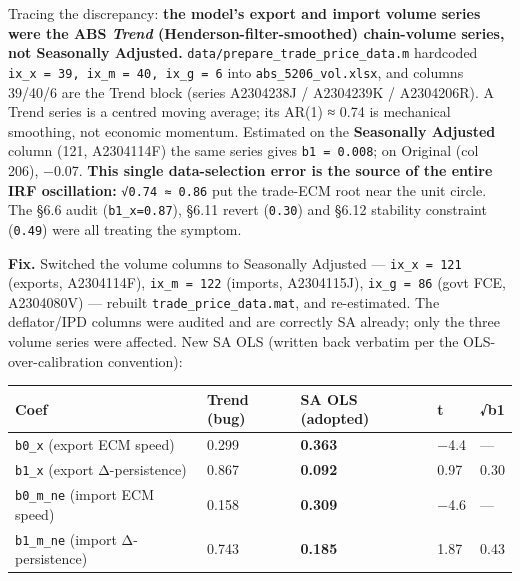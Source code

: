 \documentclass[
]{article}
\newcounter{none} %
\begin{document}
Tracing the discrepancy: \textbf{the model's export and import volume
series were the ABS \emph{Trend} (Henderson-filter-smoothed)
chain-volume series, not Seasonally Adjusted.}
\texttt{data/prepare\_trade\_price\_data.m} hardcoded
\texttt{ix\_x\ =\ 39,\ ix\_m\ =\ 40,\ ix\_g\ =\ 6} into
\texttt{abs\_5206\_vol.xlsx}, and columns 39/40/6 are the Trend block
(series A2304238J / A2304239K / A2304206R). A Trend series is a centred
moving average; its AR(1) ≈ 0.74 is mechanical smoothing, not economic
momentum. Estimated on the \textbf{Seasonally Adjusted} column (121,
A2304114F) the same series gives \texttt{b1\ =\ 0.008}; on Original (col
206), −0.07. \textbf{This single data-selection error is the source of
the entire IRF oscillation:} \texttt{√0.74\ ≈\ 0.86} put the trade-ECM
root near the unit circle. The §6.6 audit (\texttt{b1\_x=0.87}), §6.11
revert (\texttt{0.30}) and §6.12 stability constraint (\texttt{0.49})
were all treating the symptom.

\textbf{Fix.} Switched the volume columns to Seasonally Adjusted ---
\texttt{ix\_x\ =\ 121} (exports, A2304114F), \texttt{ix\_m\ =\ 122}
(imports, A2304115J), \texttt{ix\_g\ =\ 86} (govt FCE, A2304080V) ---
rebuilt \texttt{trade\_price\_data.mat}, and re-estimated. The
deflator/IPD columns were audited and are correctly SA already; only the
three volume series were affected. New SA OLS (written back verbatim per
the OLS-over-calibration convention):

{\def\LTcaptype{none} %
\begin{longtable}[]{@{}lllll@{}}
\toprule\noalign{}
Coef & Trend (bug) & \textbf{SA OLS (adopted)} & t & √b1 \\
\midrule\noalign{}
\endhead
\bottomrule\noalign{}
\endlastfoot
\texttt{b0\_x} (export ECM speed) & 0.299 & \textbf{0.363} & −4.4 &
--- \\
\texttt{b1\_x} (export Δ-persistence) & 0.867 & \textbf{0.092} & 0.97 &
0.30 \\
\texttt{b0\_m\_ne} (import ECM speed) & 0.158 & \textbf{0.309} & −4.6 &
--- \\
\texttt{b1\_m\_ne} (import Δ-persistence) & 0.743 & \textbf{0.185} &
1.87 & 0.43 \\
\end{longtable}
}
\end{document}
